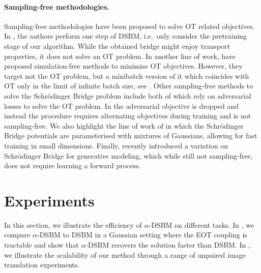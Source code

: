 \documentclass{article}
\begin{document}
\paragraph{Sampling-free methodologies.}
Sampling-free methodologies have been proposed to solve OT related objectives. In \citep{liu2023I2SB, somnath2023aligned, diefenbacher2024improving, cao2024neural}, the authors perform one step of DSBM, i.e.~only consider the pretraining stage of our algorithm. While the obtained bridge might enjoy transport properties, it does not solve an OT problem. 
In another line of work, \cite{pooladian_2023_multisample,tong_conditional_2023,tong2024simulationfree,eyring2023unbalancedness} have proposed simulation-free methods to minimise OT objectives. However, they target not the OT problem, but a minibatch version of it which coincides with OT only in the limit of infinite batch size, see \cite[Theorem 4.2]{pooladian_2023_multisample}. Other sampling-free methods to solve the Schr\"odinger Bridge problem include \cite{kim2023unpaired,gushchin2024entropic} both of which rely on adversarial losses to solve the OT problem. In \citep{debortoli2021diffusion,vargas2021solving,liu2022deep,shi2023DSBM,peluchetti_diffusion_2023} the adversarial objective is dropped and instead the procedure requires alternating objectives during training and is not sampling-free. We also highlight the line of work of \cite{korotin2023light,gushchin2024light} in which the Schr\"odinger Bridge potentials are parameterised with mixtures of Gaussians, allowing for fast training in small dimensions. Finally, recently \citet{deng2024variational} introduced a variation on Schr\"odinger Bridge for generative modeling, which while still not sampling-free, does not require learning a forward process.

\vspace{-.25cm}
\section{Experiments}
\label{sec:experiments}

In this section, we illustrate the efficiency of $\alpha$-DSBM on different tasks. In , we compare $\alpha$-DSBM to DSBM in a Gaussian setting where the EOT coupling is tractable and show that $\alpha$-DSBM recovers the solution faster than DSBM. In , we illustrate the scalability of our method through a range of unpaired image translation experiments. 
\end{document}
